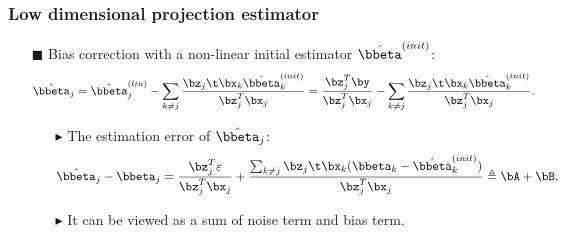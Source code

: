 \begin{frame}
\frametitle{Low dimensional projection estimator}
\begin{itemize}

\item[$\blacksquare$] Bias correction with a non-linear initial estimator $\hat{\bbeta}^{(init)}$:
\begin{equation}
\label{LDPE}
\hat{\bbeta}_{j}=\hat{\bbeta}^{(lin)}_{j} - \sum_{k \neq j}\frac{\bz_{j}\t \bx_{k} \hat{\bbeta}^{(init)}_{k} }{\bz^{T}_{j} \bx_{j}}
=\frac{\bz^{T}_{j} \by}{\bz^{T}_{j} \bx_{j}} - \sum_{k \neq j}\frac{\bz_{j}\t \bx_{k} \hat{\bbeta}^{(init)}_{k} }{\bz^{T}_{j} \bx_{j}}.
\end{equation}
   \begin{itemize}
   \item[$\blacktriangleright$] The estimation error of $\hat{\bbeta}_{j}$:
   \begin{equation}
   \label{bias(5)}
   \hat{\bbeta}_{j}-\bbeta_{j}=\frac{\bz^{T}_{j} \varepsilon}{\bz^{T}_{j} \bx_{j}} + \frac{\sum_{k \neq j} \bz_{j}\t \bx_{k} (\bbeta_{k} - \hat{\bbeta}^{(init)}_{k}) }{\bz^{T}_{j} \bx_{j}} \triangleq \bA + \bB.
   \end{equation}
   \item[$\blacktriangleright$] It can be viewed as a sum of noise term and bias term.
   \end{itemize}

\end{itemize}


\end{frame}



